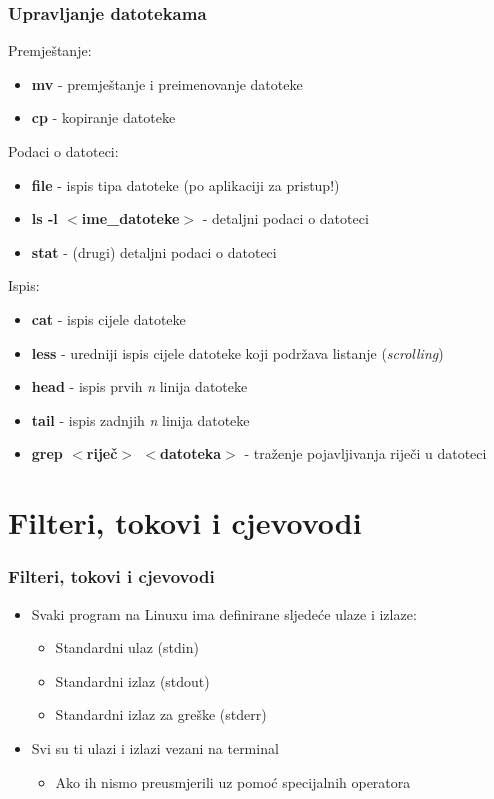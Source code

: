 \documentclass{beamer}
\begin{document}
\begin{frame}[t]
\frametitle{Upravljanje datotekama}
  Premještanje:
  \begin{itemize}
    \item \textbf{mv} - premještanje i preimenovanje datoteke
    \item \textbf{cp} - kopiranje datoteke
  \end{itemize}
  Podaci o datoteci:
  \begin{itemize}
    \item \textbf{file} - ispis tipa datoteke (po aplikaciji za pristup!)
    \item \textbf{ls -l $<$ime\_datoteke$>$} - detaljni podaci o datoteci
    \item \textbf{stat} - (drugi) detaljni podaci o datoteci
  \end{itemize}

  Ispis:
  \begin{itemize}
    \item \textbf{cat} - ispis cijele datoteke
    \item \textbf{less} - uredniji ispis cijele datoteke koji podržava listanje (\textit{scrolling})
    \item \textbf{head} - ispis prvih \textit{n} linija datoteke
    \item \textbf{tail} - ispis zadnjih \textit{n} linija datoteke
    \item \textbf{grep $<$riječ$>$ $<$datoteka$>$} - traženje pojavljivanja riječi u datoteci
  \end{itemize}
\end{frame}

\section{Filteri, tokovi i cjevovodi}
\begin{frame}[t]
\frametitle{Filteri, tokovi i cjevovodi}
\begin{itemize}
  \item Svaki program na Linuxu ima definirane sljedeće ulaze i izlaze:
  \begin{itemize}
    \item Standardni ulaz (stdin)
    \item Standardni izlaz (stdout)
    \item Standardni izlaz za greške (stderr)
  \end{itemize}
  \item Svi su ti ulazi i izlazi vezani na terminal
  \begin{itemize}
    \item Ako ih nismo preusmjerili uz pomoć specijalnih operatora
  \end{itemize}
\end{itemize}
\end{frame}
\end{document}
